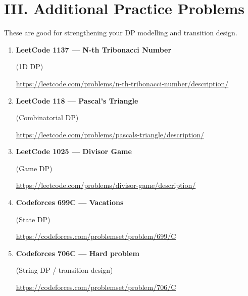\documentclass[11pt]{article}
\begin{document}
\section*{III. Additional Practice Problems}

These are good for strengthening your DP modelling and transition design.

\begin{enumerate}

\item \textbf{LeetCode 1137 --- N-th Tribonacci Number}

(1D DP)

\vspace{0.3em}
{\url{https://leetcode.com/problems/n-th-tribonacci-number/description/}}

\vspace{0.8em}

\item \textbf{LeetCode 118 --- Pascal's Triangle}

(Combinatorial DP)

\vspace{0.3em}
{\url{https://leetcode.com/problems/pascals-triangle/description/}}

\vspace{0.8em}

\item \textbf{LeetCode 1025 --- Divisor Game}

(Game DP)

\vspace{0.3em}
{\url{https://leetcode.com/problems/divisor-game/description/}}

\vspace{0.8em}

\item \textbf{Codeforces 699C --- Vacations}

(State DP)

\vspace{0.3em}
{\url{https://codeforces.com/problemset/problem/699/C}}

\vspace{0.8em}

\item \textbf{Codeforces 706C --- Hard problem}

(String DP / transition design)

\vspace{0.3em}
{\url{https://codeforces.com/problemset/problem/706/C}}


\end{enumerate}
\end{document}
